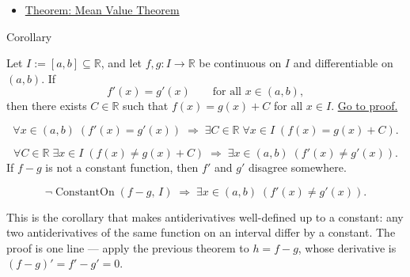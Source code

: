\begin{dependencies}
\begin{itemize}
  \item \hyperref[thm:mean-value-theorem]{Theorem: Mean Value Theorem}
\end{itemize}
\end{dependencies}


\begin{corollarybox}{Corollary}
\begin{corollary}
\label{cor:equal-derivatives-constant-difference}
Let $I := [a,b] \subseteq \mathbb{R}$, and let $f, g : I \to \mathbb{R}$ be continuous on $I$ and differentiable on $(a,b)$. If
\[
f'(x) = g'(x) \qquad \text{for all } x \in (a,b),
\]
then there exists $C \in \mathbb{R}$ such that $f(x) = g(x) + C$ for all $x \in I$.
\hyperref[prf:equal-derivatives-constant-difference]{Go to proof.}
\end{corollary}
\end{corollarybox}

\begin{remark*}
\[
\forall x \in (a,b)\;(f'(x)=g'(x))
\;\Rightarrow\;
\exists C \in \mathbb{R}\;\forall x \in I\;(f(x)=g(x)+C).
\]
\end{remark*}

\begin{remark*}
\[
\forall C \in \mathbb{R}\;\exists x \in I\;(f(x) \neq g(x)+C)
\;\Rightarrow\;
\exists x \in (a,b)\;(f'(x) \neq g'(x)).
\]
If $f - g$ is not a constant function, then $f'$ and $g'$ disagree somewhere.
\end{remark*}

\begin{remark*}
\[
\lnot\operatorname{ConstantOn}(f-g,\,I) \;\Rightarrow\; \exists x\in(a,b)\;(f'(x)\neq g'(x)).
\]
\end{remark*}

\begin{remark*}[Interpretation]
This is the corollary that makes antiderivatives well-defined up to a constant: any two antiderivatives of the same function on an interval differ by a constant. The proof is one line --- apply the previous theorem to $h = f - g$, whose derivative is $(f-g)' = f'-g' = 0$.
\end{remark*}

